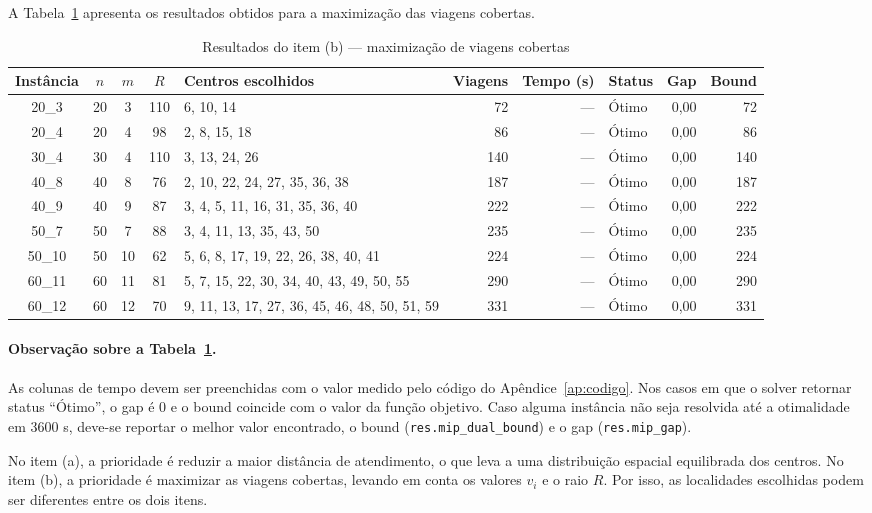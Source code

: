 \documentclass[12pt,a4paper]{article}
\begin{document}
A Tabela~\ref{tab:resultado_b} apresenta os resultados
obtidos para a maximização das viagens cobertas.

\begin{table}[H]
\centering
\caption{Resultados do item (b) --- maximização de viagens cobertas}
\label{tab:resultado_b}
\small
\begin{tabular}{c c c c l r r l r r}
\toprule
Instância & $n$ & $m$ & $R$ & Centros escolhidos &
Viagens & Tempo (s) & Status & Gap & Bound\\
\midrule
20\_3  & 20 & 3  & 110 & 6, 10, 14 & 72 & --- & Ótimo & 0,00 & 72\\
20\_4  & 20 & 4  & 98  & 2, 8, 15, 18 & 86 & --- & Ótimo & 0,00 & 86\\
30\_4  & 30 & 4  & 110 & 3, 13, 24, 26 & 140 & --- & Ótimo & 0,00 & 140\\
40\_8  & 40 & 8  & 76  & 2, 10, 22, 24, 27, 35, 36, 38 & 187 & --- & Ótimo & 0,00 & 187\\
40\_9  & 40 & 9  & 87  & 3, 4, 5, 11, 16, 31, 35, 36, 40 & 222 & --- & Ótimo & 0,00 & 222\\
50\_7  & 50 & 7  & 88  & 3, 4, 11, 13, 35, 43, 50 & 235 & --- & Ótimo & 0,00 & 235\\
50\_10 & 50 & 10 & 62  & 5, 6, 8, 17, 19, 22, 26, 38, 40, 41 & 224 & --- & Ótimo & 0,00 & 224\\
60\_11 & 60 & 11 & 81  & 5, 7, 15, 22, 30, 34, 40, 43, 49, 50, 55 & 290 & --- & Ótimo & 0,00 & 290\\
60\_12 & 60 & 12 & 70  & 9, 11, 13, 17, 27, 36, 45, 46, 48, 50, 51, 59 & 331 & --- & Ótimo & 0,00 & 331\\
\bottomrule
\end{tabular}
\end{table}

\paragraph{Observação sobre a Tabela~\ref{tab:resultado_b}.}
As colunas de tempo devem ser preenchidas com o valor medido
pelo código do Apêndice~\ref{ap:codigo}. Nos casos em que o
solver retornar status ``Ótimo'', o gap é 0 e o bound
coincide com o valor da função objetivo. Caso alguma
instância não seja resolvida até a otimalidade em 3600 s,
deve-se reportar o melhor valor encontrado, o bound
(\texttt{res.mip\_dual\_bound}) e o gap
(\texttt{res.mip\_gap}).

No item (a), a prioridade é reduzir a maior distância de
atendimento, o que leva a uma distribuição espacial
equilibrada dos centros. No item (b), a prioridade é
maximizar as viagens cobertas, levando em conta os valores
$v_i$ e o raio $R$. Por isso, as localidades escolhidas
podem ser diferentes entre os dois itens.
\end{document}
